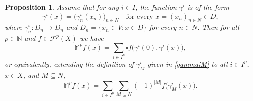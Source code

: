 \documentclass[10pt,a4paper]{amsart}
\newtheorem{proposition}{Proposition}
\begin{document}
\begin{proposition}\label{prop:IterationsMWoperatorsSpecial}
Assume that for any $i\in I$, the function $\gamma^i$ is of the form
\begin{equation*}
\gamma^i(x)=\big(\gamma^i_n(x_n)\big)_{n\in N}\quad\text{for every }x=(x_n)_{n\in N}\in D,
\end{equation*}	
where $\gamma^i_n\colon D_n\to D_n$ and $D_n=\{x_n\in V:x\in D\}$ for every $n\in N$.
Then for all $p\in\mathbb{N}$ and $f\in \mathcal{F}^p(X)$ we have 
\begin{equation*}\label{equ:mMWoperatorSpecial}
\mathbb{M}^p f(x)=\sum_{i\in I^p}\square f\big(\gamma^i(0),\gamma^i(x)\big),
\end{equation*}
or equivalently, extending the  definition of $\gamma^i_M$ given in \eqref{gammaiM} to all $i \in I^p$, $x \in X$, and $M \subseteq N$, 
\begin{equation}\label{equ:mMWoperatorSpecialDirect}
\mathbb{M}^p f(x)=\sum_{i\in I^p}\sum_{M\subseteq N}(-1)^{|M|}f\big(\gamma^i_M(x)\big).
\end{equation}
\end{proposition}	
\end{document}
